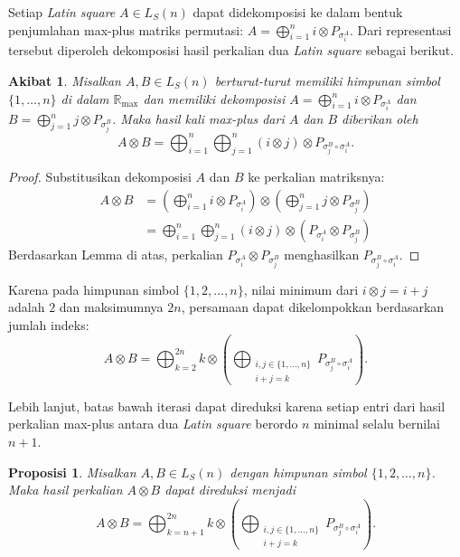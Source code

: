 \documentclass[journal]{IEEEtran}
\newtheorem{cor}[defn]{Akibat}
\theoremstyle{definition}
\theoremstyle{plain}
\newtheorem{prop}{Proposisi}
\begin{document}
Setiap \textit{Latin square} $A \in L_S(n)$ dapat didekomposisi ke dalam bentuk penjumlahan max-plus matriks permutasi: $A = \bigoplus_{i=1}^n i \otimes P_{\sigma_i^A}$. Dari representasi tersebut diperoleh dekomposisi hasil perkalian dua \textit{Latin square} sebagai berikut.
\begin{cor}
    Misalkan $A, B \in L_S(n)$ berturut-turut memiliki himpunan simbol $\{1, \ldots, n\}$ di dalam $\mathbb{R}_{\max}$ dan memiliki dekomposisi $A = \bigoplus_{i=1}^n i \otimes P_{\sigma_i^A}$ dan $B = \bigoplus_{j=1}^n j \otimes P_{\sigma_j^B}$. Maka hasil kali max-plus dari $A$ dan $B$ diberikan oleh
    \begin{equation}
        A \otimes B = \bigoplus_{i=1}^n \bigoplus_{j=1}^n (i \otimes j) \otimes P_{\sigma_j^B \circ \sigma_i^A}.
    \end{equation}
\end{cor}
\begin{proof}
    Substitusikan dekomposisi $A$ dan $B$ ke perkalian matriksnya:
    \begin{align*}
        A \otimes B & = \left(\bigoplus_{i=1}^n i \otimes P_{\sigma_i^A}\right) \otimes \left(\bigoplus_{j=1}^n j \otimes P_{\sigma_j^B}\right) \\
                    & = \bigoplus_{i=1}^n \bigoplus_{j=1}^n (i \otimes j) \otimes \left(P_{\sigma_i^A} \otimes P_{\sigma_j^B}\right)
    \end{align*}
    Berdasarkan Lemma di atas, perkalian $P_{\sigma_i^A} \otimes P_{\sigma_j^B}$ menghasilkan $P_{\sigma_j^B \circ \sigma_i^A}$.
\end{proof}

Karena pada himpunan simbol $\{1, 2, \ldots, n\}$, nilai minimum dari $i \otimes j = i+j$ adalah $2$ dan maksimumnya $2n$, persamaan dapat dikelompokkan berdasarkan jumlah indeks:
\begin{equation}
    A \otimes B = \bigoplus_{k=2}^{2n} k \otimes \left( \bigoplus_{\substack{i,j \in \{1,\ldots,n\} \\ i+j=k}} P_{\sigma_j^B \circ \sigma_i^A} \right).
\end{equation}

Lebih lanjut, batas bawah iterasi dapat direduksi karena setiap entri dari hasil perkalian max-plus antara dua \textit{Latin square} berordo $n$ minimal selalu bernilai $n+1$.
\begin{prop}
    Misalkan $A, B \in L_S(n)$ dengan himpunan simbol $\{1, 2, \ldots, n\}$. Maka hasil perkalian $A \otimes B$ dapat direduksi menjadi
    \begin{equation}
        A \otimes B = \bigoplus_{k=n+1}^{2n} k \otimes \left( \bigoplus_{\substack{i,j \in \{1,\ldots,n\} \\ i+j=k}} P_{\sigma_j^B \circ \sigma_i^A} \right).
    \end{equation}
\end{prop}
\end{document}
